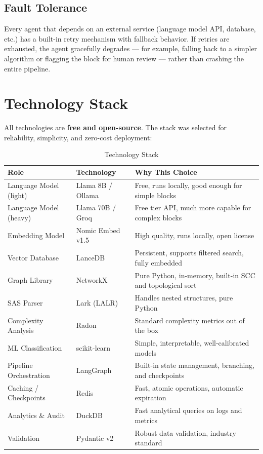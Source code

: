 \documentclass[11pt,a4paper]{article}
\begin{document}
\subsection{Fault Tolerance}

Every agent that depends on an external service (language model API, database, etc.) has a built-in retry mechanism with fallback behavior. If retries are exhausted, the agent gracefully degrades — for example, falling back to a simpler algorithm or flagging the block for human review — rather than crashing the entire pipeline.


\section{Technology Stack}

All technologies are \textbf{free and open-source}. The stack was selected for reliability, simplicity, and zero-cost deployment:

\begin{table}[H]
\centering
\caption{Technology Stack}
\renewcommand{\arraystretch}{1.3}
\small
\begin{tabularx}{\textwidth}{@{} l l X @{}}
\toprule
\textbf{Role} & \textbf{Technology} & \textbf{Why This Choice} \\
\midrule
Language Model (light) & Llama 8B / Ollama & Free, runs locally, good enough for simple blocks \\
Language Model (heavy) & Llama 70B / Groq & Free tier API, much more capable for complex blocks \\
Embedding Model & Nomic Embed v1.5 & High quality, runs locally, open license \\
Vector Database & LanceDB & Persistent, supports filtered search, fully embedded \\
Graph Library & NetworkX & Pure Python, in-memory, built-in SCC and topological sort \\
SAS Parser & Lark (LALR) & Handles nested structures, pure Python \\
Complexity Analysis & Radon & Standard complexity metrics out of the box \\
ML Classification & scikit-learn & Simple, interpretable, well-calibrated models \\
Pipeline Orchestration & LangGraph & Built-in state management, branching, and checkpoints \\
Caching / Checkpoints & Redis & Fast, atomic operations, automatic expiration \\
Analytics \& Audit & DuckDB & Fast analytical queries on logs and metrics \\
Validation & Pydantic v2 & Robust data validation, industry standard \\
\bottomrule
\end{tabularx}
\end{table}
\end{document}
